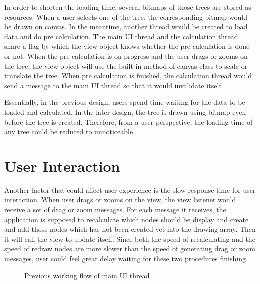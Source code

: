 \documentclass[MSc]{icldt}
\begin{document}
In order to shorten the loading time, several bitmaps of those trees are stored as resources. When a user selects one of the tree, the corresponding bitmap would be drawn on canvas. In the meantime, another thread would be created to load data and do pre calculation. The main UI thread and the calculation thread share a flag by which the view object knows whether the pre calculation is done or not. When the pre calculation is on progress and the user drags or zooms on the tree, the view object will use the built in method of canvas class to scale or translate the tree. When pre calculation is finished, the calculation thread would send a message to the main UI thread so that it would invalidate itself. 

Essentially, in the previous design, users spend time waiting for the data to be loaded and calculated. In the later design, the tree is drawn using bitmap even before the tree is created. Therefore, from a user perspective, the loading time of any tree could be reduced to unnoticeable. 

\section{User Interaction}

Another factor that could affect user experience is the slow response time for user interaction. 
When user drags or zooms on the view, the view listener would receive a set of drag or zoom messages. For each message it receives, the application is supposed to recalculate which nodes should be display and create and add those nodes which has not been created yet into the drawing array. Then it will call the view to update itself. Since both the speed of recalculating and the speed of redraw nodes are more slower than the speed of generating drag or zoom messages, user could feel great delay waiting for these two procedures finishing.


\begin{figure}[H]
\caption{Previous working flow of main UI thread}
\end{figure}
\end{document}
